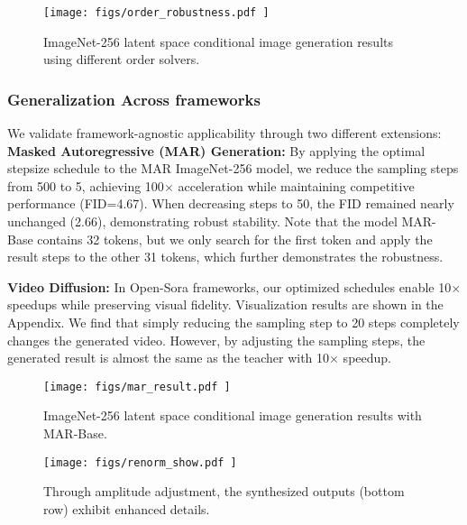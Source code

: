 \documentclass[10pt,twocolumn,letterpaper]{article}
\begin{document}
    \begin{figure}[H]
        \centering

        \texttt{[image: 
            figs/order\_robustness.pdf
        ]}
        \caption{ImageNet-256 latent space conditional image generation results using different order solvers.}
        \label{fig:order}
    \end{figure}

    
    

    \subsubsection{Generalization Across frameworks} \label{sec:different_method}
    We validate framework-agnostic applicability through two different extensions:
    \textbf{Masked Autoregressive (MAR) Generation:} By applying the optimal stepsize schedule to the MAR \cite{mar} ImageNet-256 model, we reduce the sampling steps from 500 to 5, achieving 100$\times$ acceleration while maintaining competitive performance (FID=4.67). When decreasing steps to 50, the FID remained nearly unchanged (2.66), demonstrating robust stability. Note that the model MAR-Base contains 32 tokens, but we only search for the first token and apply the result steps to the other 31 tokens, which further demonstrates the robustness.


    \textbf{Video Diffusion:} In Open-Sora \cite{opensora} frameworks, our optimized schedules enable 10$\times$ speedups while preserving visual fidelity. Visualization results are shown in the Appendix. We find that simply reducing the sampling step to 20 steps completely changes the generated video. However, by adjusting the sampling steps, the generated result is almost the same as the teacher with 10$\times$ speedup.



   \begin{figure}[H]
        \vspace{-0.4cm}
        \centering
        \texttt{[image: 
            figs/mar\_result.pdf
        ]}
        \vspace{-0.7cm}
        \caption{ImageNet-256 latent space conditional image generation results with MAR-Base.}
 \label{fig:mar}
 
    \end{figure}



    

    \begin{figure}[t]
        \centering
        \vspace{-0.3cm}
        \texttt{[image: 
            figs/renorm\_show.pdf
        ]}
        \vspace{-0.6cm}
        \caption{Through amplitude adjustment, the synthesized outputs (bottom row) exhibit enhanced details.} 
        \label{fig:renorm}
    \end{figure}
\end{document}
